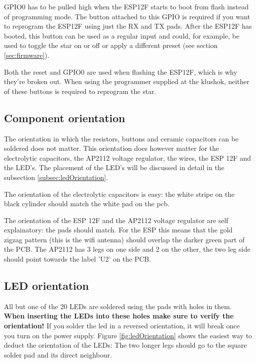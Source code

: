 \documentclass[12pt]{article}
\begin{document}
\noindent GPIO0 has to be pulled high when the ESP12F starts to boot from flash instead of programming mode. The button attached to this GPIO is required if you want to reprogram the ESP12F using just the RX and TX pads.
After the ESP12F has booted, this button can be used as a regular input and could, for example, be used to toggle the star on or off or apply a different preset (see section \ref{sec:firmware}).

\noindent Both the reset and GPIO0 are used when flashing the ESP12F, which is why they're broken out.
When using the programmer supplied at the klushok, neither of these buttons is required to reprogram the star.


\subsection{Component orientation}
The orientation in which the resistors, buttons and ceramic capacitors can be soldered does not matter. This orientation does however matter for the electrolytic capacitors, the AP2112 voltage regulator, the wires, the ESP 12F and the LED's. The placement of the LED's will be discussed in detail in the subsection \ref{subsec:ledOrientation}.
\vspace{2ex}

\noindent The orientation of the electrolytic capacitors is easy: the white stripe on the black cylinder should match the white pad on the pcb.

\noindent The orientation of the ESP 12F and the AP2112 voltage regulator are self explainatory: the pads should match. For the ESP this means that the gold zigzag pattern (this is the wifi antenna) should overlap the darker green part of the PCB. The AP2112 has 3 legs on one side and 2 on the other, the two leg side should point towards the label 'U2' on the PCB.


\subsection{LED orientation}
All but one of the 20 LEDs are soldered using the pads with holes in them. \textbf{When inserting the LEDs into these holes make sure to verify the orientation!} If you solder the led in a reversed orientation, it will break once you turn on the power supply. Figure \ref{fig:ledOrientation} shows the easiest way to deduct the orientation of the LEDs: The two longer legs should go to the square solder pad and its direct neighbour.
\end{document}
